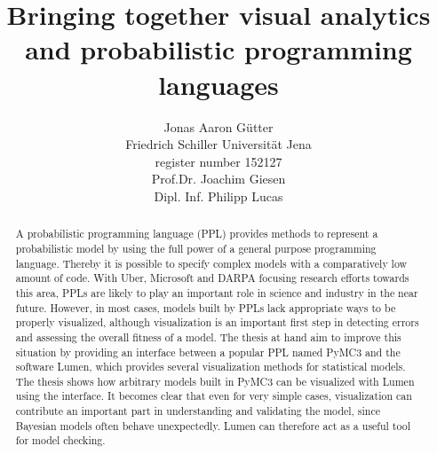 \documentclass{article}
\title{Bringing together visual analytics and probabilistic programming languages}
\author{Jonas Aaron Gütter  \\
	Friedrich Schiller Universität Jena  \\
    register number 152127 \\
    Prof.Dr. Joachim Giesen \\
    Dipl. Inf. Philipp Lucas
	}
\begin{document}
\maketitle

\begin{abstract}
A probabilistic programming language (PPL) provides methods to represent a probabilistic model by using the full power of a general purpose programming language. Thereby it is possible to specify complex models with a comparatively low amount of code. With Uber, Microsoft and DARPA focusing research efforts towards this area, PPLs are likely to play an important role in science and industry in the near future. However, in most cases, models built by PPLs lack appropriate ways to be properly visualized, although visualization is an important first step in detecting errors and assessing the overall fitness of a model. The thesis at hand aim to improve this situation by providing an interface between a popular PPL named PyMC3 and the software Lumen, which provides several visualization methods for statistical models. The thesis shows how arbitrary models built in PyMC3 can be visualized with Lumen using the interface. It becomes clear that even for very simple cases, visualization can contribute an important part in understanding and validating the model, since Bayesian models often behave unexpectedly. Lumen can therefore act as a useful tool for model checking.
\end{abstract}

\pagebreak
\tableofcontents


\printglossaries
\end{document}
